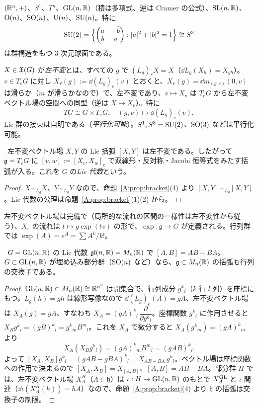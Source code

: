 \begin{ex}
$(\mathbb R^n,+)$、\allowbreak $S^1$、\allowbreak $T^n$、\allowbreak $\mathrm{GL}(n,\mathbb R)$（積は多項式、逆は Cramer の公式）、\allowbreak $\mathrm{SL}(n,\mathbb R)$、\allowbreak $\mathrm{O}(n)$、\allowbreak $\mathrm{SO}(n)$、\allowbreak $\mathrm{U}(n)$、\allowbreak $\mathrm{SU}(n)$。特に
\[
\mathrm{SU}(2)=\Bigl\{\begin{pmatrix}a&-\bar b\\b&\bar a\end{pmatrix}:|a|^2+|b|^2=1\Bigr\}\cong S^3
\]
は群構造をもつ 3 次元球面である。
\end{ex}

$X\in\mathfrak X(G)$ が\emph{左不変}とは、すべての $g$ で $(L_g)_*X=X$（$\dd L_g(X_h)=X_{gh}$）。$v\in T_eG$ に対し $X_v(g):=\dd(L_g)_e(v)$ とおくと、$X_v(g)=\dd m_{(g,e)}(0,v)$ は滑らか（$m$ が滑らかなので）で、左不変であり、$v\mapsto X_v$ は $T_eG$ から左不変ベクトル場の空間への同型（逆は $X\mapsto X_e$）。特に
\[
TG\cong G\times T_eG,\quad(g,v)\mapsto\dd(L_g)_e(v),
\]
Lie 群の接束は自明である（\emph{平行化可能}）。$S^1,S^3=\mathrm{SU}(2)$、$\mathrm{SO}(3)$ などは平行化可能。

\begin{prop}\label{A:prop:liealg}
\tP\ 左不変ベクトル場 $X,Y$ の Lie 括弧 $[X,Y]$ は左不変である。したがって $\mathfrak g=T_eG$ に $[v,w]:=[X_v,X_w]_e$ で双線形・反対称・Jacobi 恒等式をみたす括弧が入る。これを $G$ の\emph{Lie 代数}という。
\end{prop}
\begin{proof}
$X\sim_{L_g}X$、$Y\sim_{L_g}Y$ なので、命題~\ref{A:prop:bracket}(4) より $[X,Y]\sim_{L_g}[X,Y]$。Lie 代数の公理は命題~\ref{A:prop:bracket}(1)(2) から。
\end{proof}

左不変ベクトル場は完備で（局所的な流れの区間の一様性は左不変性から従う）、$X_v$ の流れは $t\mapsto g\exp(tv)$ の形で、$\exp:\mathfrak g\to G$ が定義される。行列群では $\exp(A)=e^A=\sum A^k/k!$。

\begin{thm}\label{A:thm:glbracket}
\tP\ $G=\mathrm{GL}(n,\mathbb R)$ の Lie 代数 $\mathfrak{gl}(n,\mathbb R)=M_n(\mathbb R)$ で $[A,B]=AB-BA$。$G\subset\mathrm{GL}(n,\mathbb R)$ が埋め込み部分群（$\mathrm{SO}(n)$ など）なら、$\mathfrak g\subset M_n(\mathbb R)$ の括弧も行列の交換子である。
\end{thm}
\begin{proof}
$\mathrm{GL}(n,\mathbb R)\subset M_n(\mathbb R)\cong\mathbb R^{n^2}$ は開集合で、行列成分 $g^k{}_l$（$k$ 行 $l$ 列）を座標にもつ。$L_g(h)=gh$ は線形写像なので $\dd(L_g)_e(A)=gA$、左不変ベクトル場は $X_A(g)=gA$、すなわち $X_A=(gA)^k{}_l\,\dfrac{\partial}{\partial g^k{}_l}$。座標関数 $g^k{}_l$ に作用させると $X_Bg^k{}_l=(gB)^k{}_l=g^k{}_mB^m{}_l$。これを $X_A$ で微分すると $X_A(g^k{}_m)=(gA)^k{}_m$ より
\[
X_A(X_Bg^k{}_l)=(gA)^k{}_mB^m{}_l=(gAB)^k{}_l.
\]
よって $[X_A,X_B]g^k{}_l=(gAB-gBA)^k{}_l=X_{AB-BA}\,g^k{}_l$。ベクトル場は座標関数への作用で決まるので $[X_A,X_B]=X_{[A,B]}$、$[A,B]=AB-BA$。部分群 $H$ では、左不変ベクトル場 $X^H_A$（$A\in\mathfrak h$）は $\iota:H\to\mathrm{GL}(n,\mathbb R)$ のもとで $X_A^{\mathrm{GL}}$ と $\iota$ 関連（$\dd\iota(X_A^H(h))=hA$）なので、命題~\ref{A:prop:bracket}(4) より $\mathfrak h$ の括弧は交換子の制限。
\end{proof}

